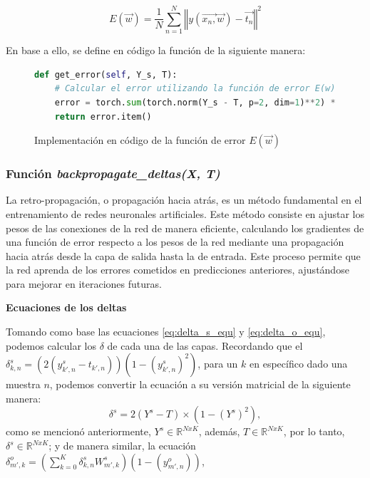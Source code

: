 \documentclass{article}
\begin{document}
\begin{equation}
E(\vec{w})=\frac{1}{N}\sum_{n=1}^{N}\left\Vert y(\vec{x_{n},}\vec{w})-\vec{t_{n}}\right\Vert ^{2} \label{eq:MSE}
\end{equation}


\noindent
En base a ello, se define en código la función de la siguiente manera:

\begin{figure}[htbp]
\begin{lstlisting}[language=Python, texcl=true]
def get_error(self, Y_s, T):
    # Calcular el error utilizando la función de error E(w)
    error = torch.sum(torch.norm(Y_s - T, p=2, dim=1)**2) * (1 / Y_s.shape[0])
    return error.item()\end{lstlisting}
    \caption{Implementación en código de la función de error $E(\Vec{w})$}
    \label{code:MSE}
\end{figure}

\newpage
\subsubsection{Función \textit{backpropagate\_deltas(X, T)}}

La retro-propagación, o propagación hacia atrás, es un método fundamental en el entrenamiento de redes neuronales artificiales. Este método consiste en ajustar los pesos de las conexiones de la red de manera eficiente, calculando los gradientes de una función de error respecto a los pesos de la red mediante una propagación hacia atrás desde la capa de salida hasta la de entrada. Este proceso permite que la red aprenda de los errores cometidos en predicciones anteriores, ajustándose para mejorar en iteraciones futuras. 
\medskip

\noindent
\textbf{Ecuaciones de los deltas}
\medskip

Tomando como base las ecuaciones \ref{eq:delta_s_equ} y \ref{eq:delta_o_equ}, podemos calcular los $\delta$ de cada una de las capas. Recordando que el $\delta_{k,n}^s = \left(2(y_{k',n}^s - t_{k',n})\right) \left(1 - (y_{k',n}^s)^2\right)$, para un $k$ en específico dado una muestra $n$, podemos convertir la ecuación a su versión matricial de la siguiente manera:
\begin{equation}
     \delta^{s} = 2(Y^{s} - T) \times (1 - (Y^{s})^{2}),\label{eq:delta_s_matrix}
\end{equation}
\noindent
como se mencionó anteriormente, $Y^s \in \mathbb{R}^{NxK}$, además, $T \in \mathbb{R}^{NxK}$, por lo tanto, $\delta^s \in \mathbb{R}^{NxK}$; y de manera similar, la ecuación $\delta_{m',k}^o = \left( \sum_{k=0}^{K} \delta_{k,n}^sW_{m',k}^s\right) (1- (y_{m',n}^o))$, 
\end{document}
